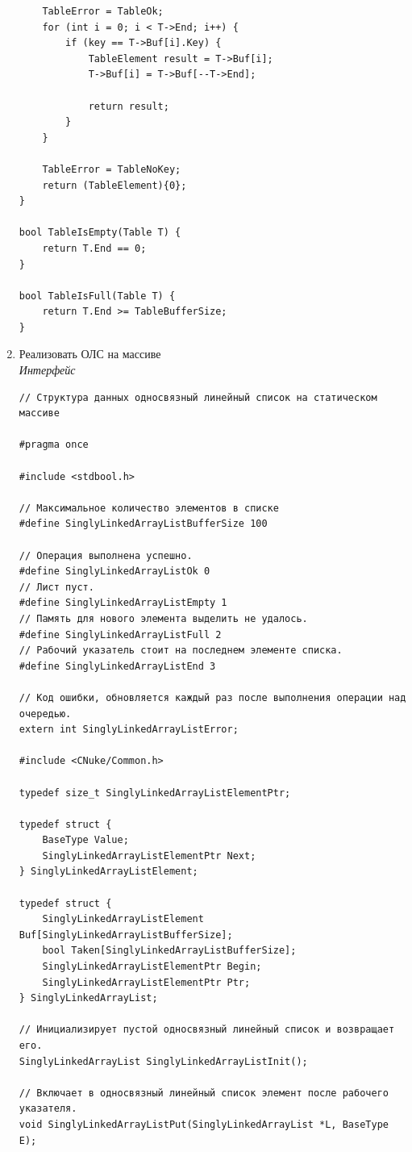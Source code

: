 \documentclass[a4paper,14pt]{extarticle}
\begin{document}
\begin{enumerate}
\begin{verbatim}
    TableError = TableOk;
    for (int i = 0; i < T->End; i++) {
        if (key == T->Buf[i].Key) {
            TableElement result = T->Buf[i];
            T->Buf[i] = T->Buf[--T->End];
            
            return result;
        }
    }

    TableError = TableNoKey;
    return (TableElement){0};
}

bool TableIsEmpty(Table T) {
    return T.End == 0;
}

bool TableIsFull(Table T) {
    return T.End >= TableBufferSize;
}
    \end{verbatim}
    \item Реализовать ОЛС на массиве\\
	\textit{Интерфейс}
    \begin{verbatim}
// Структура данных односвязный линейный список на статическом массиве

#pragma once

#include <stdbool.h>

// Максимальное количество элементов в списке
#define SinglyLinkedArrayListBufferSize 100

// Операция выполнена успешно.
#define SinglyLinkedArrayListOk 0
// Лист пуст.
#define SinglyLinkedArrayListEmpty 1
// Память для нового элемента выделить не удалось.
#define SinglyLinkedArrayListFull 2
// Рабочий указатель стоит на последнем элементе списка.
#define SinglyLinkedArrayListEnd 3

// Код ошибки, обновляется каждый раз после выполнения операции над очередью.
extern int SinglyLinkedArrayListError;

#include <CNuke/Common.h>

typedef size_t SinglyLinkedArrayListElementPtr;

typedef struct {
    BaseType Value;
    SinglyLinkedArrayListElementPtr Next;
} SinglyLinkedArrayListElement;

typedef struct {
    SinglyLinkedArrayListElement Buf[SinglyLinkedArrayListBufferSize];
    bool Taken[SinglyLinkedArrayListBufferSize];
    SinglyLinkedArrayListElementPtr Begin;
    SinglyLinkedArrayListElementPtr Ptr;
} SinglyLinkedArrayList;

// Инициализирует пустой односвязный линейный список и возвращает его.
SinglyLinkedArrayList SinglyLinkedArrayListInit();

// Включает в односвязный линейный список элемент после рабочего указателя.
void SinglyLinkedArrayListPut(SinglyLinkedArrayList *L, BaseType E);


\end{verbatim}
\end{enumerate}
\end{document}
